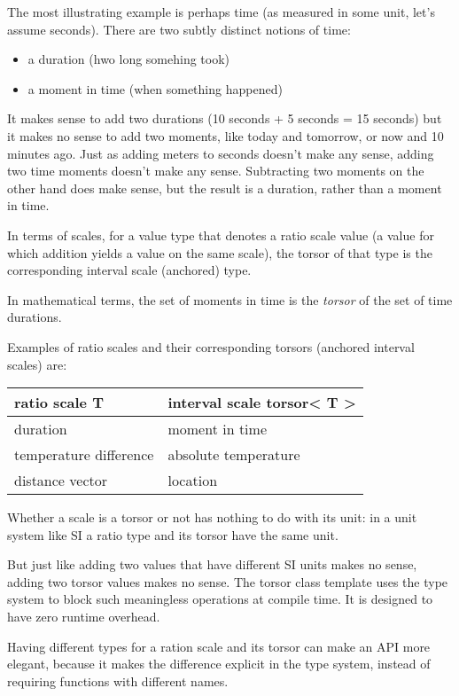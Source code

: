 \documentclass[]{article}
\providecommand{\tightlist}{%
  \setlength{\itemsep}{0pt}\setlength{\parskip}{0pt}}
\begin{document}
The most illustrating example is perhaps time (as measured in some unit,
let's assume seconds). There are two subtly distinct notions of time:

\begin{itemize}
\tightlist
\item
  a duration (hwo long somehing took)
\item
  a moment in time (when something happened)
\end{itemize}

It makes sense to add two durations (10 seconds + 5 seconds = 15
seconds) but it makes no sense to add two moments, like today and
tomorrow, or now and 10 minutes ago. Just as adding meters to seconds
doesn't make any sense, adding two time moments doesn't make any sense.
Subtracting two moments on the other hand does make sense, but the
result is a duration, rather than a moment in time.

In terms of scales, for a value type that denotes a ratio scale value (a
value for which addition yields a value on the same scale), the torsor
of that type is the corresponding interval scale (anchored) type.

In mathematical terms, the set of moments in time is the \emph{torsor}
of the set of time durations.

Examples of ratio scales and their corresponding torsors (anchored
interval scales) are:

\begin{longtable}[]{@{}ll@{}}
\toprule
ratio scale \textbf{T} & interval scale \textbf{torsor\textless{} T
\textgreater{}}\tabularnewline
\midrule
\endhead
duration & moment in time\tabularnewline
temperature difference & absolute temperature\tabularnewline
distance vector & location\tabularnewline
\bottomrule
\end{longtable}

Whether a scale is a torsor or not has nothing to do with its unit: in a
unit system like SI a ratio type and its torsor have the same unit.

But just like adding two values that have different SI units makes no
sense, adding two torsor values makes no sense. The torsor class
template uses the type system to block such meaningless operations at
compile time. It is designed to have zero runtime overhead.

Having different types for a ration scale and its torsor can make an API
more elegant, because it makes the difference explicit in the type
system, instead of requiring functions with different names.
\end{document}
